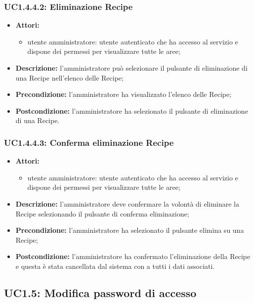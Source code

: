 \subsubsection{UC1.4.4.2: Eliminazione Recipe}

\begin{itemize}
	\item \textbf{Attori:}
	\begin{itemize}
		\item utente amministratore: utente autenticato che ha accesso al servizio e dispone dei permessi per visualizzare tutte le aree;
	\end{itemize}
	\item \textbf{Descrizione:} l'amministratore può selezionare il pulsante di eliminazione di una Recipe nell'elenco delle Recipe;
	\item \textbf{Precondizione:} l'amministratore ha visualizzato l'elenco delle Recipe;
	\item \textbf{Postcondizione:} l'amministratore ha selezionato il pulsante di eliminazione di una Recipe.
\end{itemize}
\subsubsection{UC1.4.4.3: Conferma eliminazione Recipe}

\begin{itemize}
	\item \textbf{Attori:}
	\begin{itemize}
		\item utente amministratore: utente autenticato che ha accesso al servizio e dispone dei permessi per visualizzare tutte le aree;
	\end{itemize}
	\item \textbf{Descrizione:} l'amministratore deve confermare la volontà di eliminare la Recipe selezionando il pulsante di conferma eliminazione;
	\item \textbf{Precondizione:} l'amministratore ha selezionato il pulsante elimina su una Recipe;
	\item \textbf{Postcondizione:} l'amministratore ha confermato l'eliminazione della Recipe e questa è stata cancellata dal sistema con a tutti i dati associati.
\end{itemize}

\pagebreak


\subsection{UC1.5: Modifica password di accesso}

